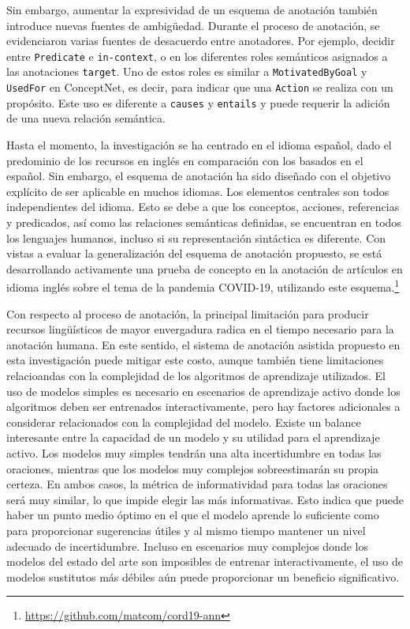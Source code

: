 Sin embargo, aumentar la expresividad de un esquema de anotación también introduce nuevas fuentes de ambigüedad.
Durante el proceso de anotación, se evidenciaron varias fuentes de desacuerdo entre anotadores. Por ejemplo, decidir entre \texttt{Predicate} e \texttt{in-context}, o en los diferentes roles semánticos asignados a las anotaciones \texttt{target}.
Uno de estos roles es similar a \texttt{MotivatedByGoal} y \texttt{UsedFor} en ConceptNet, es decir, para indicar que una \texttt{Action} se realiza con un propósito. Este uso es diferente a \texttt{causes} y \texttt{entails} y puede requerir la adición de una nueva relación semántica.

Hasta el momento, la investigación se ha centrado en el idioma español, dado el predominio de los recursos en inglés en comparación con los basados en el español.
Sin embargo, el esquema de anotación ha sido diseñado con el objetivo explícito de ser aplicable en muchos idiomas.
Los elementos centrales son todos independientes del idioma. Esto se debe a que los conceptos, acciones, referencias y predicados, así como las relaciones semánticas definidas, se encuentran en todos los lenguajes humanos, incluso si su representación sintáctica es diferente.
Con vistas a evaluar la generalización del esquema de anotación propuesto, se está desarrollando activamente una prueba de concepto en la anotación de artículos en idioma inglés sobre el tema de la pandemia COVID-19, utilizando este esquema.\footnote{\url{https://github.com/matcom/cord19-ann}}

Con respecto al proceso de anotación, la principal limitación para producir recursos lingüísticos de mayor envergadura radica en el tiempo necesario para la anotación humana. En este sentido, el sistema de anotación asistida propuesto en esta investigación puede mitigar este costo, aunque también tiene limitaciones relacioandas con la complejidad de los algoritmos de aprendizaje utilizados.
El uso de modelos simples es necesario en escenarios de aprendizaje activo donde los algoritmos deben ser entrenados interactivamente, pero hay factores adicionales a considerar relacionados con la complejidad del modelo. Existe un balance interesante entre la capacidad de un modelo y su utilidad para el aprendizaje activo. Los modelos muy simples tendrán una alta incertidumbre en todas las oraciones, mientras que los modelos muy complejos sobreestimarán su propia certeza. En ambos casos, la métrica de informatividad para todas las oraciones será muy similar, lo que impide elegir las más informativas. Esto indica que puede haber un punto medio óptimo en el que el modelo aprende lo suficiente como para proporcionar sugerencias útiles y al mismo tiempo mantener un nivel adecuado de incertidumbre.
Incluso en escenarios muy complejos donde los modelos del estado del arte son imposibles de entrenar interactivamente, el uso de modelos sustitutos más débiles aún puede proporcionar un beneficio significativo.
